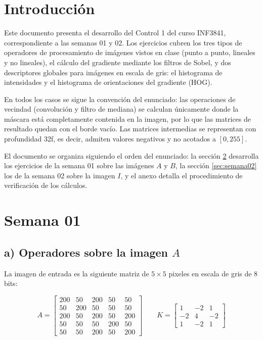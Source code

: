 \documentclass[12pt, a4paper]{article}
\begin{document}
\section{Introducción}

Este documento presenta el desarrollo del Control 1 del curso INF3841, correspondiente a las semanas 01 y 02. Los ejercicios cubren los tres tipos de operadores de procesamiento de imágenes vistos en clase (punto a punto, lineales y no lineales), el cálculo del gradiente mediante los filtros de Sobel, y dos descriptores globales para imágenes en escala de gris: el histograma de intensidades y el histograma de orientaciones del gradiente (HOG).

En todos los casos se sigue la convención del enunciado: las operaciones de vecindad (convolución y filtro de mediana) se calculan únicamente donde la máscara está completamente contenida en la imagen, por lo que las matrices de resultado quedan con el borde vacío. Las matrices intermedias se representan con profundidad 32f, es decir, admiten valores negativos y no acotados a $[0, 255]$.

El documento se organiza siguiendo el orden del enunciado: la sección \ref{sec:semana01} desarrolla los ejercicios de la semana 01 sobre las imágenes $A$ y $B$, la sección \ref{sec:semana02} los de la semana 02 sobre la imagen $I$, y el anexo detalla el procedimiento de verificación de los cálculos.

\section{Semana 01}
\label{sec:semana01}

\subsection{a) Operadores sobre la imagen $A$}

La imagen de entrada es la siguiente matriz de $5 \times 5$ pixeles en escala de gris de 8 bits:

\[
A =
\begin{bmatrix}
200 & 50 & 200 & 50 & 50 \\
50 & 200 & 50 & 50 & 50 \\
200 & 50 & 200 & 50 & 200 \\
50 & 50 & 50 & 200 & 50 \\
50 & 50 & 200 & 50 & 200
\end{bmatrix}
\qquad
K =
\begin{bmatrix}
1 & -2 & 1 \\
-2 & 4 & -2 \\
1 & -2 & 1
\end{bmatrix}
\]
\end{document}
